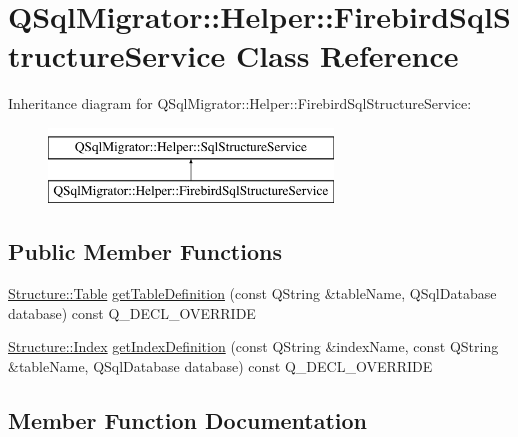 \hypertarget{class_q_sql_migrator_1_1_helper_1_1_firebird_sql_structure_service}{}\section{Q\+Sql\+Migrator\+:\+:Helper\+:\+:Firebird\+Sql\+Structure\+Service Class Reference}
\label{class_q_sql_migrator_1_1_helper_1_1_firebird_sql_structure_service}
Inheritance diagram for Q\+Sql\+Migrator\+:\+:Helper\+:\+:Firebird\+Sql\+Structure\+Service\+:\begin{figure}[H]
\begin{center}
\leavevmode
\includegraphics[height=2.000000cm]{class_q_sql_migrator_1_1_helper_1_1_firebird_sql_structure_service}
\end{center}
\end{figure}
\subsection*{Public Member Functions}
\begin{DoxyCompactItemize}
\item 
\hyperlink{class_q_sql_migrator_1_1_structure_1_1_table}{Structure\+::\+Table} \hyperlink{class_q_sql_migrator_1_1_helper_1_1_firebird_sql_structure_service_aface10de417ab9e0e749cfe2f53728e6}{get\+Table\+Definition} (const Q\+String \&table\+Name, Q\+Sql\+Database database) const Q\+\_\+\+D\+E\+C\+L\+\_\+\+O\+V\+E\+R\+R\+I\+DE
\item 
\hyperlink{class_q_sql_migrator_1_1_structure_1_1_index}{Structure\+::\+Index} \hyperlink{class_q_sql_migrator_1_1_helper_1_1_firebird_sql_structure_service_ae11053be8caa809aae7724741dc68c2b}{get\+Index\+Definition} (const Q\+String \&index\+Name, const Q\+String \&table\+Name, Q\+Sql\+Database database) const Q\+\_\+\+D\+E\+C\+L\+\_\+\+O\+V\+E\+R\+R\+I\+DE
\end{DoxyCompactItemize}


\subsection{Member Function Documentation}
\mbox{\label{class_q_sql_migrator_1_1_helper_1_1_firebird_sql_structure_service_ae11053be8caa809aae7724741dc68c2b}} 
